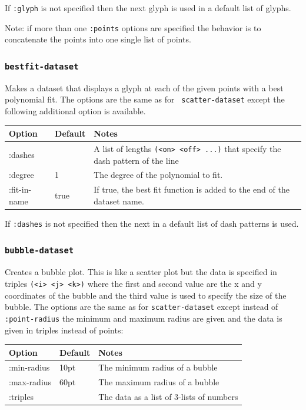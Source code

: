 \documentclass{article}
\begin{document}
If {\tt :glyph} is not specified then the next glyph is used in a
default list of glyphs.

Note: if more than one {\tt :points} options are specified the
behavior is to concatenate the points into one single list of points.

\subsubsection{\tt bestfit-dataset}

Makes a dataset that displays a glyph at each of the given points with
a best polynomial fit.  The options are the same as for {\tt
  scatter-dataset} except the following additional option is
available.

\begin{center}
\begin{tabular}{lll}
Option & Default & Notes \\
\hline
:dashes & & A list of lengths {\tt (<on> <off> ...)} that specify the
dash pattern of the line\\
:degree & 1 & The degree of the polynomial to fit. \\
:fit-in-name & true & If true, the best fit function is added to the end
of the dataset name.\\
\end{tabular}
\end{center}

If {\tt :dashes} is not specified then the next in a default list of
dash patterns is used.

\subsubsection{\tt bubble-dataset}

Creates a bubble plot.  This is like a scatter plot but the data is
specified in triples {\tt (<i> <j> <k>)} where the first and second
value are the x and y coordinates of the bubble and the third value is
used to specify the size of the bubble.  The options are the same as
for {\tt scatter-dataset} except instead of {\tt :point-radius} the
minimum and maximum radius are given and the data is given in triples
instead of points:

\begin{center}
\begin{tabular}{lll}
Option & Default & Notes \\
\hline
:min-radius & 10pt & The minimum radius of a bubble\\
:max-radius & 60pt & The maximum radius of a bubble\\
:triples & & The data as a list of 3-lists of numbers\\
\end{tabular}
\end{center}
\end{document}
